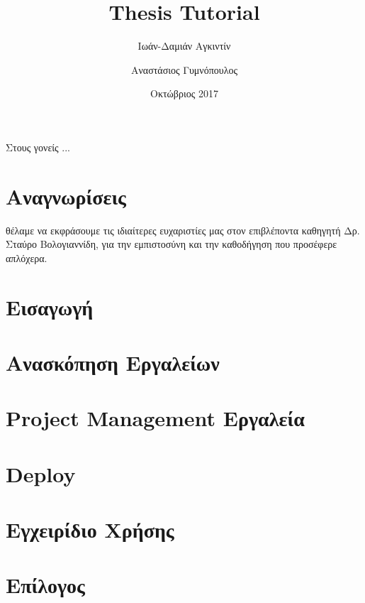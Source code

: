 \documentclass[12pt,twoside]{report}
\title{Thesis Tutorial}
\author{
\textgreek{Ιωάν-Δαμιάν Αγκιντίν}
\and
\textgreek{Αναστάσιος Γυμνόπουλος}
}
\date{\textgreek{Οκτώβριος} 2017}
\newcommand{\e}[1]{\foreignlanguage{english}{#1}}
\begin{document}







\chapter*{}
\begin{FlushRight}
Στους γονείς ...
\end{FlushRight}



\chapter*{Αναγνωρίσεις}
 θέλαμε να εκφράσουμε τις ιδιαίτερες ευχαριστίες μας στον επιβλέποντα καθηγητή Δρ. Σταύρο Βολογιαννίδη, για την εμπιστοσύνη και την καθοδήγηση που προσέφερε απλόχερα.

\tableofcontents

\listoffigures

\listoftables

\chapter{Εισαγωγή}


\chapter{Ανασκόπηση Εργαλείων}


\chapter{\e{Project Management} Εργαλεία}


\chapter{\e{Deploy}}


\chapter{Εγχειρίδιο Χρήσης}


\chapter{Επίλογος}



\printbibliography
\end{document}
